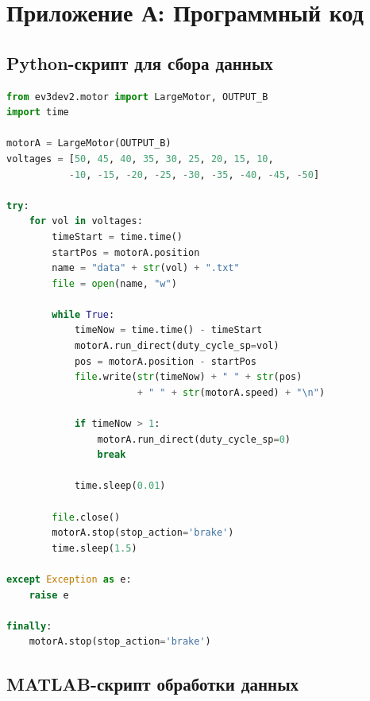 \documentclass[a4paper, 12pt]{article}
\begin{document}
\newpage

\section*{Приложение А: Программный код}

\subsection*{Python-скрипт для сбора данных}

\begin{lstlisting}[language=Python, caption=Скрипт для сбора экспериментальных данных]
from ev3dev2.motor import LargeMotor, OUTPUT_B
import time

motorA = LargeMotor(OUTPUT_B)
voltages = [50, 45, 40, 35, 30, 25, 20, 15, 10,
           -10, -15, -20, -25, -30, -35, -40, -45, -50]

try:
    for vol in voltages:
        timeStart = time.time()
        startPos = motorA.position
        name = "data" + str(vol) + ".txt"
        file = open(name, "w")

        while True:
            timeNow = time.time() - timeStart
            motorA.run_direct(duty_cycle_sp=vol)
            pos = motorA.position - startPos
            file.write(str(timeNow) + " " + str(pos)
                       + " " + str(motorA.speed) + "\n")

            if timeNow > 1:
                motorA.run_direct(duty_cycle_sp=0)
                break

            time.sleep(0.01)

        file.close()
        motorA.stop(stop_action='brake')
        time.sleep(1.5)

except Exception as e:
    raise e

finally:
    motorA.stop(stop_action='brake')
\end{lstlisting}

\subsection*{MATLAB-скрипт обработки данных}
\end{document}
